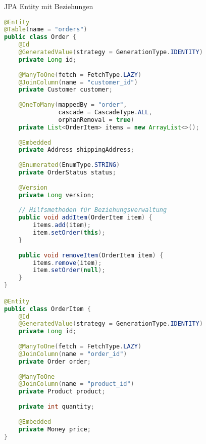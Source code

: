 \begin{example}{JPA Entity mit Beziehungen}
\begin{lstlisting}[language=Java]
@Entity
@Table(name = "orders")
public class Order {
    @Id
    @GeneratedValue(strategy = GenerationType.IDENTITY)
    private Long id;
    
    @ManyToOne(fetch = FetchType.LAZY)
    @JoinColumn(name = "customer_id")
    private Customer customer;
    
    @OneToMany(mappedBy = "order", 
               cascade = CascadeType.ALL,
               orphanRemoval = true)
    private List<OrderItem> items = new ArrayList<>();
    
    @Embedded
    private Address shippingAddress;
    
    @Enumerated(EnumType.STRING)
    private OrderStatus status;
    
    @Version
    private Long version;
    
    // Hilfsmethoden für Beziehungsverwaltung
    public void addItem(OrderItem item) {
        items.add(item);
        item.setOrder(this);
    }
    
    public void removeItem(OrderItem item) {
        items.remove(item);
        item.setOrder(null);
    }
}

@Entity
public class OrderItem {
    @Id
    @GeneratedValue(strategy = GenerationType.IDENTITY)
    private Long id;
    
    @ManyToOne(fetch = FetchType.LAZY)
    @JoinColumn(name = "order_id")
    private Order order;
    
    @ManyToOne
    @JoinColumn(name = "product_id")
    private Product product;
    
    private int quantity;
    
    @Embedded
    private Money price;
}
\end{lstlisting}
\end{example}

